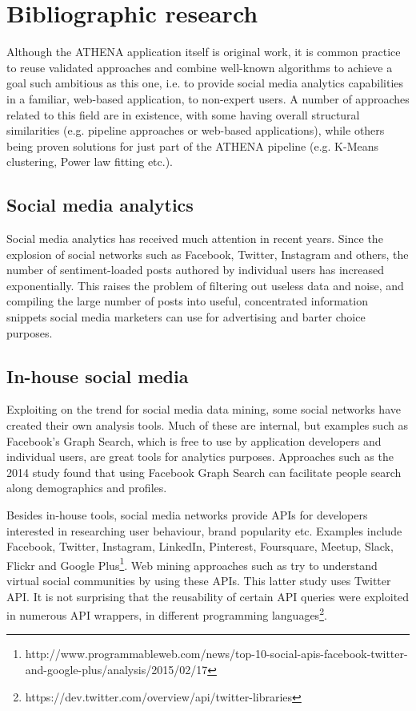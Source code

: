 \documentclass[12pt,a4paper,twoside]{report}
\begin{document}
\newpage

\listoffigures
\tableofcontents
\newpage







\chapter{Bibliographic research}

Although the ATHENA application itself is original work, it is common practice to reuse validated approaches and combine well-known algorithms to achieve a goal such ambitious as this one, i.e. to provide social media analytics capabilities in a familiar, web-based application, to non-expert users. A number of approaches related to this field are in existence, with some having overall structural similarities (e.g. pipeline approaches or web-based applications), while others being proven solutions for just part of the ATHENA pipeline (e.g. K-Means clustering, Power law fitting etc.).

\section{Social media analytics}
Social media analytics has received much attention in recent years. Since the explosion of social networks such as Facebook, Twitter, Instagram and others, the number of sentiment-loaded posts authored by individual users has increased exponentially. This raises the problem of filtering out useless data and noise, and compiling the large number of posts into useful, concentrated information snippets social media marketers can use for advertising and barter choice purposes.

\section{In-house social media}
Exploiting on the trend for social media data mining, some social networks have created their own analysis tools. Much of these are internal, but examples such as Facebook's Graph Search, which is free to use by application developers and individual users, are great tools for analytics purposes. Approaches such as the 2014 study \cite{spirin2014people} found that using Facebook Graph Search can facilitate people search along demographics and profiles.

Besides in-house tools, social media networks provide APIs for developers interested in researching user behaviour, brand popularity etc. Examples include Facebook, Twitter, Instagram, LinkedIn, Pinterest, Foursquare, Meetup, Slack, Flickr and Google Plus\footnote{http://www.programmableweb.com/news/top-10-social-apis-facebook-twitter-and-google-plus/analysis/2015/02/17}. Web mining approaches such as \cite{java2007we} try to understand virtual social communities by using these APIs. This latter study uses Twitter API. It is not surprising that the reusability of certain API queries were exploited in numerous API wrappers, in different programming languages\footnote{https://dev.twitter.com/overview/api/twitter-libraries}.
\end{document}

